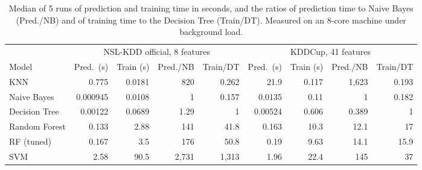 \begin{table}[t]
\centering
\caption{Median of 5 runs of prediction and training time in seconds, and the ratios of prediction time to Naive Bayes (Pred./NB) and of training time to the Decision Tree (Train/DT). Measured on an 8-core machine under background load.}
\label{tab:timing}
\footnotesize
\setlength{\tabcolsep}{2.5pt}
\begin{tabular}{lrrrrrrrr}
\toprule
 & \multicolumn{4}{c}{NSL-KDD official, 8 features} & \multicolumn{4}{c}{KDDCup, 41 features} \\
\cmidrule(lr){2-5}\cmidrule(lr){6-9}
Model & Pred.\ (s) & Train (s) & Pred./NB & Train/DT & Pred.\ (s) & Train (s) & Pred./NB & Train/DT \\
\midrule
KNN & 0.775 & 0.0181 & 820 & 0.262 & 21.9 & 0.117 & 1{,}623 & 0.193 \\
Naive Bayes & 0.000945 & 0.0108 & 1 & 0.157 & 0.0135 & 0.11 & 1 & 0.182 \\
Decision Tree & 0.00122 & 0.0689 & 1.29 & 1 & 0.00524 & 0.606 & 0.389 & 1 \\
Random Forest & 0.133 & 2.88 & 141 & 41.8 & 0.163 & 10.3 & 12.1 & 17 \\
RF (tuned) & 0.167 & 3.5 & 176 & 50.8 & 0.19 & 9.63 & 14.1 & 15.9 \\
SVM & 2.58 & 90.5 & 2{,}731 & 1{,}313 & 1.96 & 22.4 & 145 & 37 \\
\bottomrule
\end{tabular}
\end{table}
